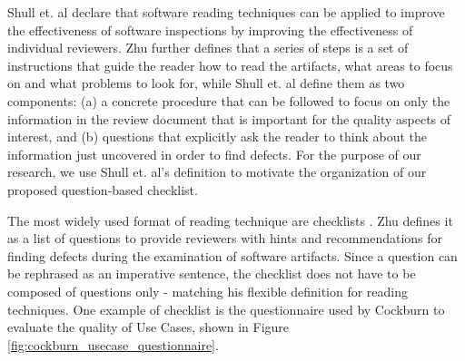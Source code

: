 Shull et. al \cite{Shull_et_dot_al_2003} declare that software reading techniques can be applied to improve the effectiveness of software inspections by improving the effectiveness of individual reviewers. Zhu \cite{Zhu_2016} further defines that a series of steps is a set of instructions that guide the reader how to read the artifacts, what areas to focus on and what problems to look for, while Shull et. al \cite{Shull_et_dot_al_2003} define them as two components: (a) a concrete procedure that can be followed to focus on only the information in the review document that is important for the quality aspects of interest, and (b) questions that explicitly ask the reader to think about the information just uncovered in order to find defects. For the purpose of our research, we use Shull et. al's definition \cite{Shull_et_dot_al_2003} to motivate the organization of our proposed question-based checklist.

The most widely used format of reading technique are checklists \cite{Zhu_2016}. Zhu defines it as a list of questions to provide reviewers with hints and recommendations for finding defects during the examination of software artifacts. Since a question can be rephrased as an imperative sentence, the checklist does not have to be composed of questions only - matching his flexible definition for reading techniques. One example of checklist is the questionnaire used by Cockburn \cite{Cockburn_2000} to evaluate the quality of Use Cases, shown in Figure \ref{fig:cockburn_usecase_questionnaire}. 

